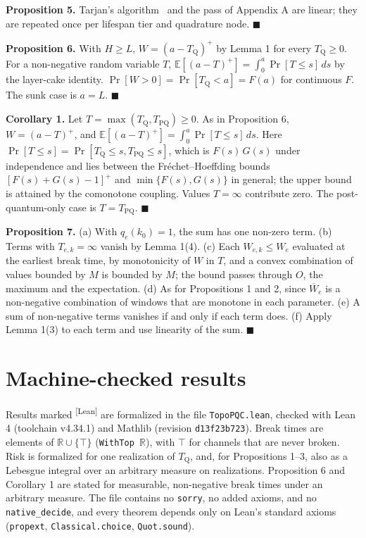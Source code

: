 \documentclass[conference]{IEEEtran}
\newcommand{\Tq}{T_{\mathrm{Q}}}
\providecommand{\E}{}\renewcommand{\E}{\mathbb{E}}
\newcommand{\pos}[1]{\left[#1\right]^{+}}
\providecommand{\lt}{}\renewcommand{\lt}{<}
\providecommand{\gt}{}\renewcommand{\gt}{>}
\newcommand{\leantag}{\textsuperscript{\textsf{\scriptsize[Lean]}}}
\newenvironment{envblock}{\par\smallskip\noindent\ignorespaces}{\par\smallskip}
\begin{document}
\begin{envblock}
\textbf{Proposition 5.} Tarjan's algorithm~\cite{tarjan1972} and the pass of Appendix A are linear; they are repeated once per lifespan tier and quadrature node. \hfill$\blacksquare$

\textbf{Proposition 6.} With $H \ge L$, $W = (a - \Tq)^+$ by Lemma 1 for every $\Tq \ge 0$. For a non-negative random variable $T$, $\E[(a - T)^+] = \int_0^a \Pr[T \le s]\,ds$ by the layer-cake identity. $\Pr[W \gt 0] = \Pr[\Tq \lt a] = F(a)$ for continuous $F$. The sunk case is $a = L$. \hfill$\blacksquare$

\textbf{Corollary 1.} Let $T = \max(\Tq, T_{\mathrm{PQ}}) \ge 0$. As in Proposition 6, $W = (a - T)^+$, and $\E[(a - T)^+] = \int_0^a \Pr[T \le s]\,ds$. Here $\Pr[T \le s] = \Pr[\Tq \le s, T_{\mathrm{PQ}} \le s]$, which is $F(s)\,G(s)$ under independence and lies between the Fréchet–Hoeffding bounds $\pos{F(s) + G(s) - 1}$ and $\min\{F(s), G(s)\}$ in general; the upper bound is attained by the comonotone coupling. Values $T = \infty$ contribute zero. The post-quantum-only case is $T = T_{\mathrm{PQ}}$. \hfill$\blacksquare$

\textbf{Proposition 7.} (a) With $q_e(k_0) = 1$, the sum has one non-zero term. (b) Terms with $T_{e,k} = \infty$ vanish by Lemma 1(4). (c) Each $W_{e,k} \le W_{e}$ evaluated at the earliest break time, by monotonicity of $W$ in $T$, and a convex combination of values bounded by $M$ is bounded by $M$; the bound passes through $O$, the maximum and the expectation. (d) As for Propositions 1 and 2, since $\overline{W}_e$ is a non-negative combination of windows that are monotone in each parameter. (e) A sum of non-negative terms vanishes if and only if each term does. (f) Apply Lemma 1(3) to each term and use linearity of the sum. \hfill$\blacksquare$
\end{envblock}

\section{Machine-checked results}\label{app:C}

Results marked \leantag{} are formalized in the file \texttt{TopoPQC.lean}, checked with Lean 4 (toolchain v4.34.1) and Mathlib (revision \texttt{d13f23b723}). Break times are elements of $\mathbb{R} \cup \{\top\}$ (\texttt{WithTop $\mathbb{R}$}), with $\top$ for channels that are never broken. Risk is formalized for one realization of $\Tq$, and, for Propositions 1–3, also as a Lebesgue integral over an arbitrary measure on realizations. Proposition 6 and Corollary 1 are stated for measurable, non-negative break times under an arbitrary measure. The file contains no \texttt{sorry}, no added axioms, and no \texttt{native\_\allowbreak{}decide}, and every theorem depends only on Lean's standard axioms (\texttt{propext}, \texttt{Classical.choice}, \texttt{Quot.sound}).
\end{document}
